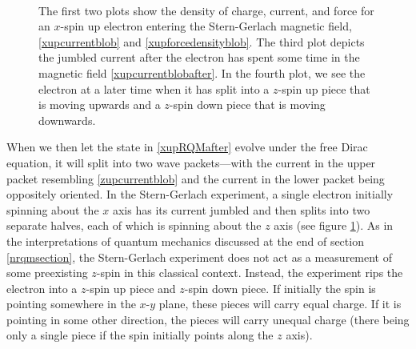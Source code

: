 \documentclass[12pt,secnumarabic,amsmath,amssymb,balancelastpage,nofootinbib]{article}
\begin{document}
\begin{figure}[p!]
\\
\vspace*{-4pt}
\caption{The first two plots show the density of charge, current, and force for an $x$-spin up electron entering the Stern-Gerlach magnetic field, \eqref{xupcurrentblob} and \eqref{xupforcedensityblob}.  The third plot depicts the jumbled current after the electron has spent some time in the magnetic field \eqref{xupcurrentblobafter}.  In the fourth plot, we see the electron at a later time when it has split into a $z$-spin up piece that is moving upwards and a $z$-spin down piece that is moving downwards.}
  \label{SG4}
\end{figure}

When we then let the state in \eqref{xupRQMafter} evolve under the free Dirac equation, it will split into two wave packets---with the current in the upper packet resembling \eqref{zupcurrentblob} and the current in the lower packet being oppositely oriented.  In the Stern-Gerlach experiment, a single electron initially spinning about the $x$ axis has its current jumbled and then splits into two separate halves, each of which is spinning about the $z$ axis (see figure \ref{SG4}).  As in the interpretations of quantum mechanics discussed at the end of section \ref{nrqmsection}, the Stern-Gerlach experiment does not act as a measurement of some preexisting $z$-spin in this classical context.  Instead, the experiment rips the electron into a $z$-spin up piece and $z$-spin down piece.  If initially the spin is pointing somewhere in the $x$-$y$ plane, these pieces will carry equal charge.  If it is pointing in some other direction, the pieces will carry unequal charge (there being only a single piece if the spin initially points along the $z$ axis).
\end{document}
